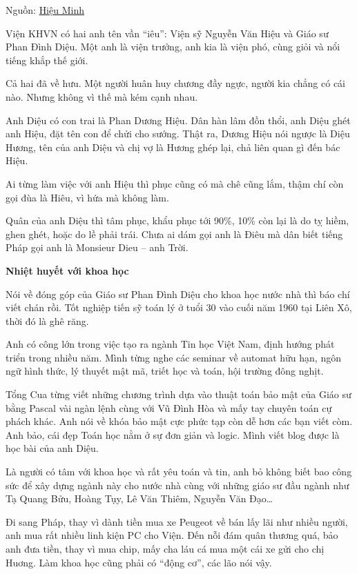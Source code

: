 
Nguồn: \href{http://meddom.org/vai-ky-niem-voi-giao-su-phan-dinh-dieu-gudi/}{Hiệu Minh}

Viện KHVN có hai anh tên vần “iêu”: Viện sỹ Nguyễn Văn Hiệu và Giáo sư Phan Đình Diệu. Một anh là viện trưởng, anh kia là viện phó, cùng giỏi và nổi tiếng khắp thế giới.

Cả hai đã về hưu. Một người huân huy chương đầy ngực, người kia chẳng có cái nào. Nhưng không vì thế mà kém cạnh nhau.


Anh Diệu có con trai là Phan Dương Hiệu. Dân hàn lâm đồn thổi, anh Diệu ghét anh Hiệu, đặt tên con để chửi cho sướng. Thật ra, Dương Hiệu nói ngược là Diệu Hương, tên của anh Diệu và chị vợ là Hương ghép lại, chả liên quan gì đến bác Hiệu.

Ai từng làm việc với anh Hiệu thì phục cũng có mà chê cũng lắm, thậm chí còn gọi đùa là Hiêu, vì hứa mà không làm.

Quân của anh Diệu thì tâm phục, khẩu phục tới 90\%, 10\% còn lại là do tỵ hiềm, ghen ghét, hoặc do lề phải trái. Chưa ai dám gọi anh là Điêu mà dân biết tiếng Pháp gọi anh là Monsieur Dieu – anh Trời.

\begin{center}
\textbf{Nhiệt huyết với khoa học}
\end{center}

Nói về đóng góp của Giáo sư Phan Đình Diệu cho khoa học nước nhà thì báo chí viết chán rồi. Tốt nghiệp tiến sỹ toán lý ở tuổi 30 vào cuối năm 1960 tại Liên Xô, thời đó là ghê răng.

Anh có công lớn trong việc tạo ra ngành Tin học Việt Nam, định hướng phát triển trong nhiều năm. Mình từng nghe các seminar về automat hữu hạn, ngôn ngữ hình thức, lý thuyết mật mã, triết học và toán, hội trường đông nghịt.

Tổng Cua từng viết những chương trình dựa vào thuật toán bảo mật của Giáo sư bằng Pascal vài ngàn lệnh cùng với Vũ Đình Hòa và mấy tay chuyên toán cự phách khác. Anh nói về khóa bảo mật cực phức tạp còn dễ hơn các bạn viết còm. Anh bảo, cái đẹp Toán học nằm ở sự đơn giản và logic. Mình viết blog được là học bài của anh Diệu.

Là người có tâm với khoa học và rất yêu toán và tin, anh bỏ không biết bao công sức để xây dựng ngành này cho nước nhà cùng với những giáo sư đầu ngành như Tạ Quang Bửu, Hoàng  Tụy, Lê Văn Thiêm, Nguyễn Văn Đạo…

Đi sang Pháp, thay vì dành tiền mua xe Peugeot về bán lấy lãi như nhiều người, anh mua rất nhiều linh kiện PC cho Viện. Đến nỗi đám quân thương quá, bảo anh đưa tiền, thay vì mua chip, mấy cha láu cá mua một cái xe gửi cho chị Huơng. Làm khoa học cũng phải có “động cơ”, các lão nói vậy.

